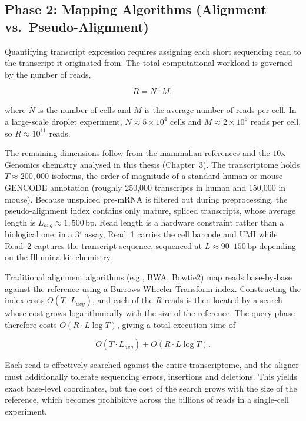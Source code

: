 \subsection{Phase 2: Mapping Algorithms (Alignment vs.\ Pseudo-Alignment)}
Quantifying transcript expression requires assigning each short sequencing read to the transcript it originated from. The total computational workload is governed by the number of reads,

$$R = N \cdot M,$$

where $N$ is the number of cells and $M$ is the average number of reads per cell. In a large-scale droplet experiment, $N \approx 5 \times 10^4$ cells and $M \approx 2 \times 10^6$ reads per cell, so $R \approx 10^{11}$ reads.

The remaining dimensions follow from the mammalian references and the $10$x Genomics chemistry analysed in this thesis (Chapter~3). The transcriptome holds $T \approx 200{,}000$ isoforms, the order of magnitude of a standard human or mouse GENCODE annotation (roughly 250{,}000 transcripts in human and 150{,}000 in mouse). Because unspliced pre-mRNA is filtered out during preprocessing, the pseudo-alignment index contains only mature, spliced transcripts, whose average length is $L_{avg} \approx 1{,}500$\,bp. Read length is a hardware constraint rather than a biological one: in a $3'$ assay, Read~1 carries the cell barcode and UMI while Read~2 captures the transcript sequence, sequenced at $L \approx 90$--$150$\,bp depending on the Illumina kit chemistry.

Traditional alignment algorithms (e.g., BWA, Bowtie2) map reads base-by-base against the reference using a Burrows-Wheeler Transform index. Constructing the index costs $O(T \cdot L_{avg})$, and each of the $R$ reads is then located by a search whose cost grows logarithmically with the size of the reference. The query phase therefore costs $O(R \cdot L \log T)$, giving a total execution time of

$$O(T \cdot L_{avg}) + O(R \cdot L \log T).$$

Each read is effectively searched against the entire transcriptome, and the aligner must additionally tolerate sequencing errors, insertions and deletions. This yields exact base-level coordinates, but the cost of the search grows with the size of the reference, which becomes prohibitive across the billions of reads in a single-cell experiment.

